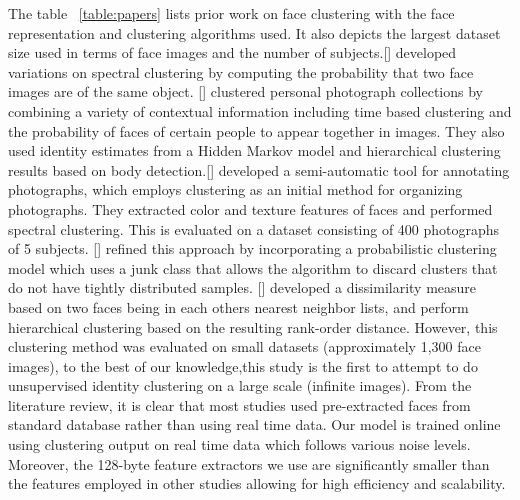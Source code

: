\documentclass[a4paper,12pt, twoside]{NITKReport}
\begin{document}
\par The table ~\ref{table:papers} lists prior work on face clustering with the face representation and clustering algorithms used. It also depicts the largest dataset size used in terms of face images and the number of subjects.[\cite{ho2003clustering}] developed variations on spectral clustering by computing the probability that two face images are of the same object. [\cite{zhao2006automatic}] clustered personal photograph collections by combining a variety of contextual information including time based clustering and the probability of faces of certain people to appear together in images. They also used identity estimates from a Hidden Markov model and  hierarchical  clustering results based on body detection.[\cite{cui2007easyalbum}] developed a semi-automatic tool for annotating photographs, which employs clustering as an initial method for organizing photographs. They extracted color and texture features of faces and performed spectral clustering. This is evaluated on a dataset consisting of 400 photographs of 5 subjects. [\cite{tian2007face}] refined this approach by incorporating a probabilistic clustering model which uses a junk class that allows the algorithm to discard clusters that do not have tightly distributed samples. [\cite{zhu2011rank}] developed a dissimilarity measure based on two faces being in each others nearest neighbor lists, and perform hierarchical clustering based on the resulting rank-order distance.  However, this clustering method was evaluated on small datasets (approximately 1,300 face images), to the best of our knowledge,this study is the first to attempt to do unsupervised identity  clustering on a large scale (infinite images). From the literature review, it is  clear that most studies used pre-extracted faces from standard database rather than using real time data. Our model is trained online using clustering output on real time data which follows various noise levels. Moreover, the 128-byte feature extractors we use are significantly smaller than the features employed in other  studies allowing for high efficiency and scalability.
\end{document}
